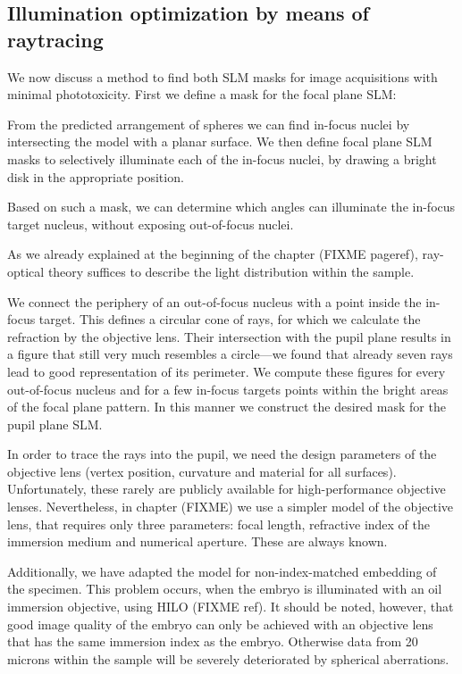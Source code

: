 \subsection{Illumination optimization by means of raytracing}
We now discuss a method to find both SLM masks for image acquisitions
with minimal phototoxicity. First we define a mask for the focal plane
SLM:

From the predicted arrangement of spheres we can find in-focus nuclei
by intersecting the model with a planar surface. We then define focal
plane SLM masks to selectively illuminate each of the in-focus nuclei,
by drawing a bright disk in the appropriate position.

Based on such a mask, we can determine which angles can illuminate the
in-focus target nucleus, without exposing out-of-focus nuclei.

As we already explained at the beginning of the chapter (FIXME
pageref), ray-optical theory suffices to describe the light
distribution within the sample.

We connect the periphery of an out-of-focus nucleus with a point
inside the in-focus target. This defines a circular cone of rays, for
which we calculate the refraction by the objective lens. Their
intersection with the pupil plane results in a figure that still very
much resembles a circle---we found that already seven rays lead to good
representation of its perimeter.  We compute these figures for every
out-of-focus nucleus and for a few in-focus targets points within the
bright areas of the focal plane pattern. In this manner we construct
the desired mask for the pupil plane SLM.

In order to trace the rays into the pupil, we need the design parameters of
the objective lens (vertex position, curvature and material for all
surfaces). Unfortunately, these rarely are publicly
available for high-performance objective lenses. Nevertheless, in
chapter (FIXME) we use a simpler model of the objective lens, that
requires only three parameters: focal length, refractive index of the
immersion medium and numerical aperture. These are always known.

Additionally, we have adapted the model for non-index-matched
embedding of the specimen. This problem occurs, when the embryo is
illuminated with an oil immersion objective, using HILO (FIXME
ref). It should be noted, however, that good image quality of the
embryo can only be achieved with an objective lens that has the same
immersion index as the embryo. Otherwise data from 20 microns within
the sample will be severely deteriorated by spherical aberrations.
